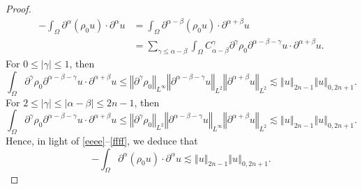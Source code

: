 \documentclass[a4paper,reqno,11pt]{amsart}
\numberwithin{equation}{section}
\providecommand{\abs}[1]{\left\vert#1\right\vert}
\providecommand{\norm}[1]{\left\Vert#1\right\Vert}
\providecommand{\norm}[1]{\left\Vert#1\right\Vert}
\begin{document}
\begin{proof}
\begin{equation}
\begin{split}
 -\int_\Omega   \partial^\alpha ( \rho_0      u) \cdot   \partial^\alpha  u
& =\int_\Omega   \partial^{\alpha-\beta} ( \rho_0      u) \cdot   \partial^{\alpha+\beta}  u
\\& =\sum_{\gamma\le \alpha-\beta}\int_\Omega C_{\alpha-\beta}^\gamma    {\partial}^\gamma \rho_0     \partial^{\alpha-\beta-\gamma} u  \cdot   \partial^{\alpha+\beta}  u.
 \end{split}
\end{equation}
For $0\le \abs{\gamma}\le 1$, then
\begin{equation}
\int_\Omega    {\partial}^\gamma \rho_0     \partial^{\alpha-\beta-\gamma} u  \cdot   \partial^{\alpha+\beta}  u
\le \norm{{\partial}^\gamma\rho_0}_{L^\infty}\norm{ \partial^{\alpha-\beta-\gamma} u}_{L^2} \norm{\partial^{\alpha+\beta}  u}_{L^2}{\lesssim} \norm{u}_{2n-1}\norm{u}_{0,2n+1}.
\end{equation}
For $2\le \abs{\gamma}\le \abs{\alpha-\beta}\le 2n-1$, then
\begin{equation}\label{ffff}
\int_\Omega    {\partial}^\gamma \rho_0     \partial^{\alpha-\beta-\gamma} u  \cdot   \partial^{\alpha+\beta}  u
\le \norm{{\partial}^\gamma\rho_0}_{L^2}\norm{ \partial^{\alpha-\beta-\gamma} u}_{L^\infty} \norm{\partial^{\alpha+\beta}  u}_{L^2}{\lesssim} \norm{u}_{2n-1}\norm{u}_{0,2n+1}.
\end{equation}
Hence, in light of \eqref{eeee}--\eqref{ffff}, we deduce that
\begin{equation}
 -\int_\Omega   \partial^\alpha ( \rho_0      u) \cdot   \partial^\alpha  u{\lesssim}\norm{u}_{2n-1}\norm{u}_{0,2n+1}.
\end{equation}


\end{proof}
\end{document}
